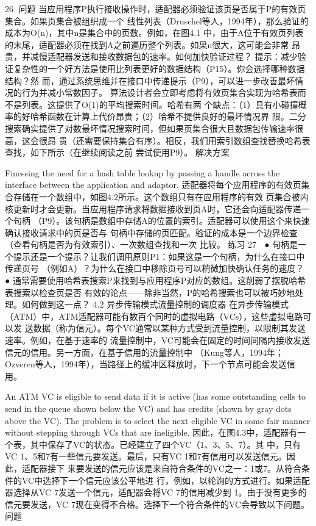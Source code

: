                                                                                                     26
问题
当应用程序P执行接收操作时，适配器必须验证该页是否属于P的有效页集合。如果页集合被组织成一个
线性列表（Druschel等人，1994年），那么验证的成本为O(n)，其中n是集合中的页数。例如，在图4.1
中，由于A位于有效页列表的末尾，适配器必须在找到A之前遍历整个列表。如果n很大，这可能会非常
昂贵，并减慢适配器发送和接收数据包的速率。如何加快验证过程？
提示：减少验证复杂性的一个好方法是使用比列表更好的数据结构（P15）。你会选择哪种数据结构？然
而，通过系统思维并在接口中传递提示（P9），可以进一步改善最坏情况的行为并减小常数因子。
算法设计者会立即考虑将有效页集合实现为哈希表而不是列表。这提供了O(1)的平均搜索时间。哈希有两
个缺点：（1）具有小碰撞概率的好哈希函数在计算上代价昂贵；（2）哈希不提供良好的最坏情况界
限。二分搜索确实提供了对数最坏情况搜索时间，但如果页集合很大且数据包传输速率很高，这会很昂
贵（还需要保持集合有序）。相反，我们用索引数组查找替换哈希表查找，如下所示（在继续阅读之前
尝试使用P9）。
解决方案




Finessing the need for a hash table lookup by passing a handle across the interface between the
application and adaptor.
适配器将每个应用程序的有效页集合存储在一个数组中，如图4.2所示。这个数组只有在应用程序的有效
页集合被内核更新时才会更新。当应用程序请求将数据接收到页A时，它还会向适配器传递一个句柄
（P9）。该句柄是数组中存储A的位置的索引。适配器可以使用这个来快速确认接收请求中的页是否与
句柄中存储的页匹配。验证的成本是一个边界检查（查看句柄是否为有效索引）、一次数组查找和一次
比较。
练习
                                                                                             27
 ● 句柄是一个提示还是一个提示？让我们调用原则P1：如果这是一个句柄，为什么在接口中传递页号
   （例如A）？为什么在接口中移除页号可以稍微加快确认任务的速度？
 ● 通常需要使用哈希表搜索P来找到与应用程序P对应的数组。这削弱了摆脱哈希表搜索以检查页是否
   有效的论点——除非当然，P的哈希搜索也可以被巧妙地处理。如何做到这一点？
4.2 异步传输模式流量控制的调度器
在异步传输模式（ATM）中，ATM适配器可能有数百个同时的虚拟电路（VCs），这些虚拟电路可以发
送数据（称为信元）。每个VC通常以某种方式受到流量控制，以限制其发送速率。例如，在基于速率的
流量控制中，VC可能会在固定的时间间隔内接收发送信元的信用。另一方面，在基于信用的流量控制中
（Kung等人，1994年；Ozveren等人，1994年），当路径上的缓冲区释放时，下一个节点可能会发送信
用。




An ATM VC is eligible to send data if it is active (has some outstanding cells to send in the
queue shown below the VC) and has credits (shown by gray dots above the VC). The problem is
to select the next eligible VC in some fair manner without stepping through VCs that are
ineligible.
因此，在图4.3中，适配器有一个表，其中保存了VC的状态。已经建立了四个VC（1、3、5、7）。其
中，只有VC 1、5和7有一些信元要发送。最后，只有VC 1和7有信用可以发送信元。因此，适配器接下
来要发送的信元应该是来自符合条件的VC之一：1或7。从符合条件的VC中选择下一个信元应该公平地进
行，例如，以轮询的方式进行。如果适配器选择从VC 7发送一个信元，适配器会将VC 7的信用减少到
1。由于没有更多的信元要发送，VC 7现在变得不合格。选择下一个符合条件的VC会导致以下问题。
问题

